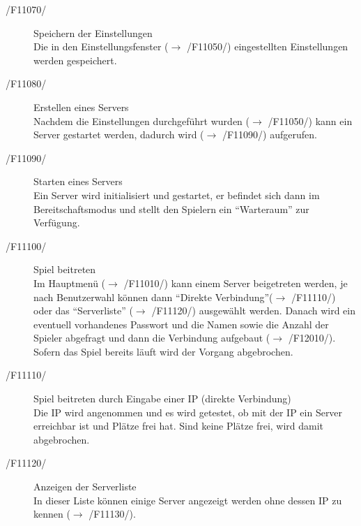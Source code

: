 \documentclass[a4paper,10pt]{article}
\begin{document}
\begin{description}
\item[/F11070/] Speichern der Einstellungen \\
Die in den Einstellungsfenster ($\rightarrow$ /F11050/) eingestellten Einstellungen werden gespeichert.

\item[/F11080/] Erstellen eines Servers \\
Nachdem die Einstellungen durchgeführt wurden ($\rightarrow$ /F11050/) kann ein Server gestartet werden, dadurch wird ($\rightarrow$ /F11090/) aufgerufen.

\item[/F11090/] Starten eines Servers \\
Ein Server wird initialisiert und gestartet, er befindet sich dann im Bereitschaftsmodus und stellt den Spielern ein "`Warteraum"' zur Verfügung.

\item[/F11100/] Spiel beitreten \\
Im Hauptmenü ($\rightarrow$ /F11010/) kann einem Server beigetreten werden, je nach Benutzerwahl können dann "`Direkte Verbindung"'($\rightarrow$ /F11110/) oder das "`Serverliste"' ($\rightarrow$ /F11120/) ausgewählt werden. Danach wird ein eventuell vorhandenes Passwort und die Namen sowie die Anzahl der Spieler abgefragt und dann die Verbindung aufgebaut ($\rightarrow$ /F12010/). Sofern das Spiel bereits läuft wird der Vorgang abgebrochen.

\item[/F11110/] Spiel beitreten durch Eingabe einer IP (direkte Verbindung) \\
Die IP wird angenommen und es wird getestet, ob mit der IP ein Server erreichbar ist und Plätze frei hat. Sind keine Plätze frei, wird damit abgebrochen.

\item[/F11120/] Anzeigen der Serverliste \\
In dieser Liste können einige Server angezeigt werden ohne dessen IP zu kennen ($\rightarrow$ /F11130/).


\end{description}
\end{document}
